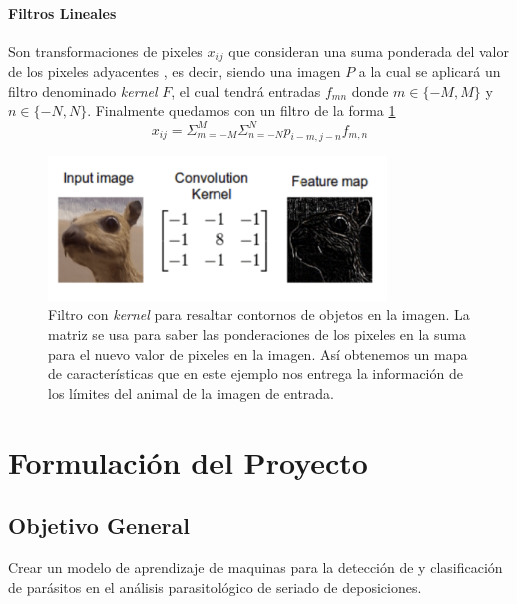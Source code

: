 \documentclass[letter,12pt]{report}
\begin{document}
\subsubsection{Filtros Lineales}
Son transformaciones de pixeles $x_{ij}$ que consideran una suma ponderada del valor de
los pixeles adyacentes \cite{Conv}, es decir, siendo una imagen $P$ a la cual se  aplicará
un filtro denominado \textit{kernel} $F$, el cual tendrá entradas $f_{mn}$ donde
$m\in\{-M,M\}$ y $n\in\{-N,N\}$. Finalmente quedamos con un filtro de la forma
\ref{fig:kernel}
$$x_{ij}=\Sigma_{m=-M}^M\Sigma_{n=-N}^Np_{i-m,j-n}f_{m,n}$$

\begin{figure}[H]
    \centering
    \includegraphics[width=0.8\textwidth]{kernel}
    \caption{Filtro con \textit{kernel} para resaltar contornos de objetos en la imagen.
        La matriz se usa para saber las ponderaciones de los pixeles en la suma para el nuevo
        valor de pixeles en la imagen. Así obtenemos un mapa de características que en este
    ejemplo nos entrega la información de los límites del animal de la imagen de entrada.}
    \label{fig:kernel}
\end{figure}


\chapter{Formulación del Proyecto}\label{formulación}

\section{Objetivo General}
Crear un modelo de aprendizaje de maquinas para la detección de y clasificación de
parásitos en el análisis parasitológico de seriado de deposiciones.
\end{document}
